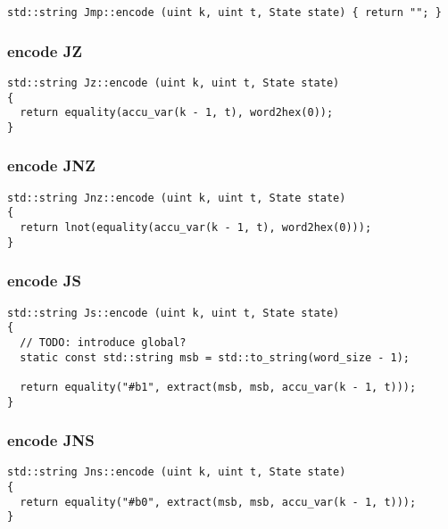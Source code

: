\begin{lstlisting}[style=c++]
std::string Jmp::encode (uint k, uint t, State state) { return ""; }
\end{lstlisting}

\subsubsection{encode JZ}

\begin{lstlisting}[style=c++]
std::string Jz::encode (uint k, uint t, State state)
{
  return equality(accu_var(k - 1, t), word2hex(0));
}
\end{lstlisting}

\subsubsection{encode JNZ}

\begin{lstlisting}[style=c++]
std::string Jnz::encode (uint k, uint t, State state)
{
  return lnot(equality(accu_var(k - 1, t), word2hex(0)));
}
\end{lstlisting}

\subsubsection{encode JS}

\begin{lstlisting}[style=c++]
std::string Js::encode (uint k, uint t, State state)
{
  // TODO: introduce global?
  static const std::string msb = std::to_string(word_size - 1);

  return equality("#b1", extract(msb, msb, accu_var(k - 1, t)));
}
\end{lstlisting}

\subsubsection{encode JNS}

\begin{lstlisting}[style=c++]
std::string Jns::encode (uint k, uint t, State state)
{
  return equality("#b0", extract(msb, msb, accu_var(k - 1, t)));
}
\end{lstlisting}


